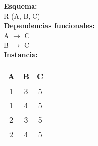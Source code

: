 \documentclass[preview]{standalone}
\begin{document}
\textbf{Esquema:}\\
R (A, B, C)\\

\textbf{Dependencias funcionales:}\\
A $\rightarrow$ C\\
B $\rightarrow$ C\\

\textbf{Instancia:}\\
\begin{tabular}{ | c | c | c |}
  \hline			
  A & B & C \\
  \hline			
  1 & 3 & 5 \\
  1 & 4 & 5 \\
  2 & 3 & 5 \\
  2 & 4 & 5 \\
  \hline  
\end{tabular}
\end{document}
